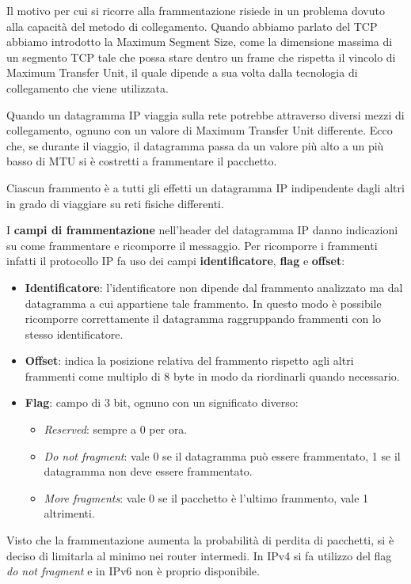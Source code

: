 Il motivo per cui si ricorre alla frammentazione risiede in un 
problema dovuto alla capacità del metodo di collegamento. Quando 
abbiamo parlato del TCP abbiamo introdotto la Maximum Segment Size,
come la dimensione massima di un segmento TCP tale che possa stare
dentro un frame che rispetta il vincolo di Maximum Transfer Unit, il
quale dipende a sua volta dalla tecnologia di collegamento che viene
utilizzata.

Quando un datagramma IP viaggia sulla rete potrebbe attraverso diversi
mezzi di collegamento, ognuno con un valore di Maximum Transfer Unit
differente. Ecco che, se durante il viaggio, il datagramma passa da un
valore più alto a un più basso di MTU si è costretti a frammentare il
pacchetto.

Ciascun frammento è a tutti gli effetti un datagramma IP indipendente
dagli altri in grado di viaggiare su reti fisiche differenti.

I \textbf{campi di frammentazione} nell'header del datagramma IP
danno indicazioni su come frammentare e ricomporre il messaggio. Per
ricomporre i frammenti infatti il protocollo IP fa uso dei campi 
\textbf{identificatore}, \textbf{flag} e \textbf{offset}:
\begin{itemize}
	\item \textbf{Identificatore}: l'identificatore non dipende dal 
		frammento analizzato ma dal datagramma a cui appartiene tale
		frammento. In questo modo è possibile ricomporre correttamente
		il datagramma raggruppando frammenti con lo stesso 
		identificatore.
	\item \textbf{Offset}: indica la posizione relativa del frammento
		rispetto agli altri frammenti come multiplo di 8 byte in modo 
		da riordinarli quando necessario.
	\item \textbf{Flag}: campo di 3 bit, ognuno con un significato
		diverso:
		\begin{itemize}
			\item \emph{Reserved}: sempre a 0 per ora.
			\item \emph{Do not fragment}: vale 0 se il datagramma può 
				essere frammentato, 1 se il datagramma non deve essere
				frammentato.
			\item \emph{More fragments}: vale 0 se il pacchetto è
				l'ultimo frammento, vale 1 altrimenti.
		\end{itemize}
\end{itemize}
Visto che la frammentazione aumenta la probabilità di perdita di 
pacchetti, si è deciso di limitarla al minimo nei router intermedi.
In IPv4 si fa utilizzo del flag \emph{do not fragment} e in IPv6 non 
è proprio disponibile.

